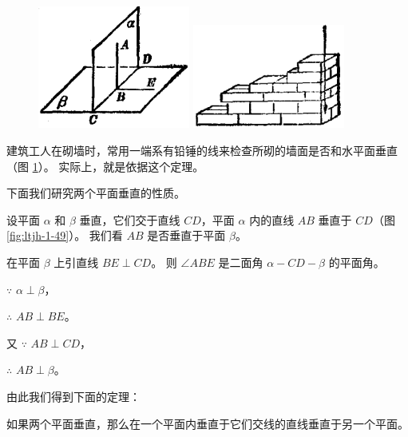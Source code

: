 \begin{figure}[htbp]
    \centering
    \begin{minipage}[b]{7cm}
        \centering
        \includegraphics[width=5cm]{../pic/ltjh-ch1-49.png}
        \caption{}\label{fig:ltjh-1-49}
    \end{minipage}
    \qquad
    \begin{minipage}[b]{7cm}
        \centering
        \includegraphics[width=5cm]{../pic/ltjh-ch1-50.png}
        \caption{}\label{fig:ltjh-1-50}
    \end{minipage}
\end{figure}

建筑工人在砌墙时，常用一端系有铅锤的线来检查所砌的墙面是否和水平面垂直（图 \ref{fig:ltjh-1-50}）。
实际上，就是依据这个定理。

下面我们研究两个平面垂直的性质。

设平面 $\alpha$ 和 $\beta$ 垂直，它们交于直线 $CD$，平面 $\alpha$ 内的直线 $AB$ 垂直于 $CD$（图 \ref{fig:ltjh-1-49}）。
我们看 $AB$ 是否垂直于平面 $\beta$。

在平面 $\beta$ 上引直线 $BE \perp CD$。 则 $\angle ABE$ 是二面角 $\alpha{-}CD{-}\beta$ 的平面角。

$\because$ \quad $\alpha \perp \beta$，

$\therefore$ \quad $AB \perp BE$。

又 $\because$ \quad $AB \perp CD$，

$\therefore$ \quad $AB \perp \beta$。

由此我们得到下面的定理：

\begin{dingli}[两个平面垂直的性质定理][dl:lgpmcz-xz]
    如果两个平面垂直，那么在一个平面内垂直于它们交线的直线垂直于另一个平面。
\end{dingli}




